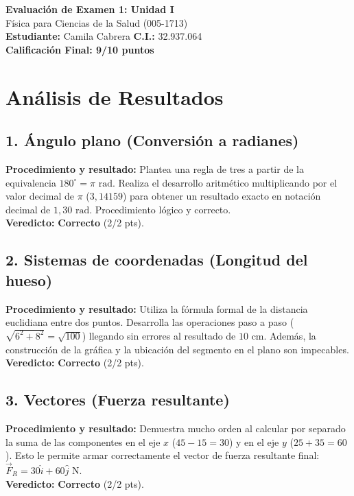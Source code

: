 \documentclass[12pt]{article}
\begin{document}
\begin{center}
    \Large \textbf{Evaluación de Examen 1: Unidad I} \\
    \large Física para Ciencias de la Salud (005-1713) \\
    \vspace{0.5cm}
    \textbf{Estudiante:} Camila Cabrera \quad \textbf{C.I.:} 32.937.064
    \vspace{0.3cm} \\
    \large \textbf{Calificación Final: 9/10 puntos}
\end{center}

\vspace{0.5cm}

\section*{Análisis de Resultados}

\subsection*{1. Ángulo plano (Conversión a radianes)}
\textbf{Procedimiento y resultado:} Plantea una regla de tres a partir de la equivalencia $180^\circ = \pi \text{ rad}$. Realiza el desarrollo aritmético multiplicando por el valor decimal de $\pi$ ($3,14159$) para obtener un resultado exacto en notación decimal de $1,30 \text{ rad}$. Procedimiento lógico y correcto. \\
\textbf{Veredicto:} \textbf{Correcto} (2/2 pts).

\subsection*{2. Sistemas de coordenadas (Longitud del hueso)}
\textbf{Procedimiento y resultado:} Utiliza la fórmula formal de la distancia euclidiana entre dos puntos. Desarrolla las operaciones paso a paso ($\sqrt{6^2 + 8^2} = \sqrt{100}$) llegando sin errores al resultado de $10 \text{ cm}$. Además, la construcción de la gráfica y la ubicación del segmento en el plano son impecables. \\
\textbf{Veredicto:} \textbf{Correcto} (2/2 pts).

\subsection*{3. Vectores (Fuerza resultante)}
\textbf{Procedimiento y resultado:} Demuestra mucho orden al calcular por separado la suma de las componentes en el eje $x$ ($45 - 15 = 30$) y en el eje $y$ ($25 + 35 = 60$). Esto le permite armar correctamente el vector de fuerza resultante final: $\vec{F}_R = 30\hat{i} + 60\hat{j}$ N. \\
\textbf{Veredicto:} \textbf{Correcto} (2/2 pts).
\end{document}
